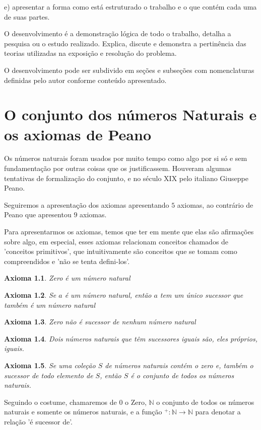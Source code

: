 \documentclass[
	12pt,				%
	oneside,			%
	a4paper,			%
	english,			%
	french,				%
	spanish,			%
	brazil,				%
	]{abntex2}
\newcommand{\N}{\ensuremath {\mathbb{N}} }
\theoremstyle{plain}
\newtheorem{axi}{Axioma}
\theoremstyle{definition}
\begin{document}
    e) apresentar a forma como está estruturado o trabalho e o que contém cada uma de suas partes.
    
O desenvolvimento é a demonstração lógica de todo o trabalho, detalha a pesquisa ou o estudo realizado. Explica, discute e demonstra a pertinência das teorias utilizadas na exposição e resolução do problema. 

O desenvolvimento pode ser subdivido em seções e subseções com nomenclaturas definidas pelo autor conforme conteúdo apresentado. 

\chapter{O conjunto dos números Naturais e os axiomas de Peano}
Os números naturais foram usados por muito tempo como algo por si só e sem fundamentação por outras coisas que os justificassem.
Houveram algumas tentativas de formalização do conjunto, e no século XIX pelo italiano Giuseppe Peano.

Seguiremos a apresentação dos axiomas apresentando $5$ axiomas, ao contrário de Peano que apresentou $9$ axiomas.

Para apresentarmos os axiomas, temos que ter em mente que elas são afirmações sobre algo, em especial, esses axiomas relacionam conceitos chamados de 'conceitos primitivos', que intuitivamente são conceitos que se tomam como compreendidos e 'não se tenta defini-los'.



\begin{axi}{Zero é um número natural}\label{P1}\end{axi}
\begin{axi}{Se $a$ é um número natural, então $a$ tem um único sucessor que também é um número natural}\label{P2}\end{axi}
\begin{axi}{Zero não é sucessor de nenhum número natural}\label{P3}\end{axi}
\begin{axi}{Dois números naturais que têm sucessores iguais são, eles próprios, iguais.}\label{P4}\end{axi}
\begin{axi}{Se uma coleção $S$ de números naturais contém o zero e, também o sucessor de todo elemento de $S$, então $S$ é o conjunto de todos os números naturais.}\label{P5}\end{axi}

Seguindo o costume, chamaremos de $0$ o Zero, \N o conjunto de todos os números naturais e somente os números naturais, e a função $^+: \N \rightarrow \N$ para denotar a relação 'é sucessor de'.
\end{document}
